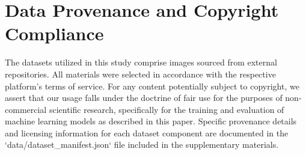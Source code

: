 \clearpage

\section*{Data Provenance and Copyright Compliance}
The datasets utilized in this study comprise images sourced from external repositories. 
All materials were selected in accordance with the respective platform's terms of service. 
For any content potentially subject to copyright, we assert that our usage falls under the doctrine of fair use for the purposes of non-commercial scientific research, 
specifically for the training and evaluation of machine learning models as described in this paper. 
Specific provenance details and licensing information for each dataset component are documented in the `data/dataset_manifest.json` file included in the supplementary materials.

